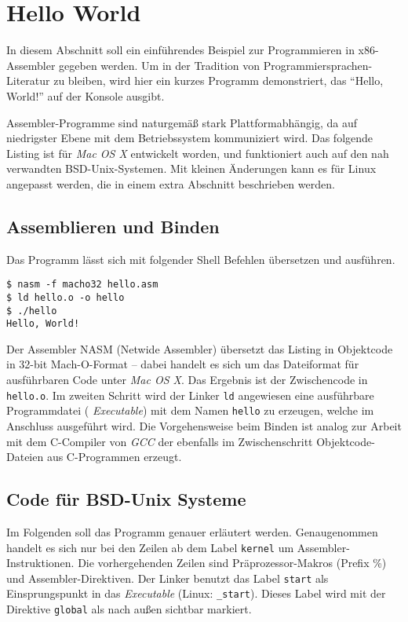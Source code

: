 \section{Hello World}

In diesem Abschnitt soll ein einführendes Beispiel zur Programmieren in x86-Assembler gegeben werden. Um in der Tradition von Programmiersprachen-Literatur zu bleiben, wird hier ein kurzes Programm demonstriert, das ``Hello, World!'' auf der Konsole ausgibt.

Assembler-Programme sind naturgemäß stark Plattformabhängig, da auf niedrigster Ebene mit dem Betriebssystem kommuniziert wird.
Das folgende Listing ist für \emph{Mac OS X} entwickelt worden, und
funktioniert auch auf den nah verwandten BSD-Unix-Systemen. Mit kleinen Änderungen kann es für Linux angepasst werden, die in einem extra Abschnitt beschrieben werden.

\subsection{Assemblieren und Binden}

Das Programm lässt sich mit folgender Shell Befehlen übersetzen und ausführen.

\begin{lstlisting}[caption=Assemblieren und Binden von hello.asm]
$ nasm -f macho32 hello.asm
$ ld hello.o -o hello
$ ./hello
Hello, World!
\end{lstlisting}

Der Assembler NASM (Netwide Assembler) übersetzt das Listing in Objektcode in 32-bit Mach-O-Format – dabei handelt es sich um das Dateiformat für ausführbaren Code unter \emph{Mac OS X}. Das Ergebnis ist der Zwischencode in \texttt{hello.o}. Im zweiten Schritt wird der Linker \texttt{ld} angewiesen eine ausführbare Programmdatei (\emph{ Executable}) mit dem Namen \texttt{hello} zu erzeugen, welche im Anschluss ausgeführt wird. Die Vorgehensweise beim Binden ist analog zur Arbeit mit dem C-Compiler von \emph{GCC} der ebenfalls im Zwischenschritt Objektcode-Dateien aus C-Programmen erzeugt.

\subsection{Code für BSD-Unix Systeme}

Im Folgenden soll das Programm genauer erläutert werden. Genaugenommen handelt es sich nur bei den Zeilen ab dem Label \texttt{kernel} um Assembler-Instruktionen. Die vorhergehenden Zeilen sind Präprozessor-Makros (Prefix \%) und Assembler-Direktiven. Der Linker benutzt das Label {\tt start} als Einsprungspunkt in das \emph{Executable} (Linux: {\tt \_start}).
Dieses Label wird mit der Direktive {\tt global} als nach außen sichtbar markiert.

